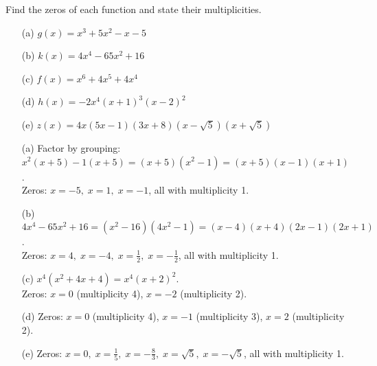 \documentclass{ximera}
\begin{document}
\begin{problem}
Find the zeros of each function and state their multiplicities.
\begin{enumerate}
  \item[(a)] $g(x) = x^3 + 5x^2 - x - 5$
  \medskip
  \item[(b)] $k(x) = 4x^4 - 65x^2 + 16$
  \medskip
  \item[(c)] $f(x) = x^6 + 4x^5 + 4x^4$
  \medskip
  \item[(d)] $h(x) = -2x^4(x+1)^3(x-2)^2$
  \medskip
  \item[(e)] $z(x) = 4x(5x-1)(3x+8)(x-\sqrt{5})(x+\sqrt{5})$
\end{enumerate}

\begin{solution}
\begin{enumerate}
  \item[(a)] Factor by grouping: $x^2(x+5)-1(x+5) = (x+5)(x^2-1) = (x+5)(x-1)(x+1)$.\\
  Zeros: $x=-5,\; x=1,\; x=-1$, all with multiplicity 1.

  \item[(b)] $4x^4-65x^2+16 = (x^2-16)(4x^2-1) = (x-4)(x+4)(2x-1)(2x+1)$.\\
  Zeros: $x=4,\; x=-4,\; x=\frac{1}{2},\; x=-\frac{1}{2}$, all with multiplicity 1.

  \item[(c)] $x^4(x^2+4x+4) = x^4(x+2)^2$.\\
  Zeros: $x=0$ (multiplicity 4), $x=-2$ (multiplicity 2).

  \item[(d)] Zeros: $x=0$ (multiplicity 4), $x=-1$ (multiplicity 3), $x=2$ (multiplicity 2).

  \item[(e)] Zeros: $x=0,\; x=\frac{1}{5},\; x=-\frac{8}{3},\; x=\sqrt{5},\; x=-\sqrt{5}$, all with multiplicity 1.
\end{enumerate}
\end{solution}
\end{problem}
\end{document}
